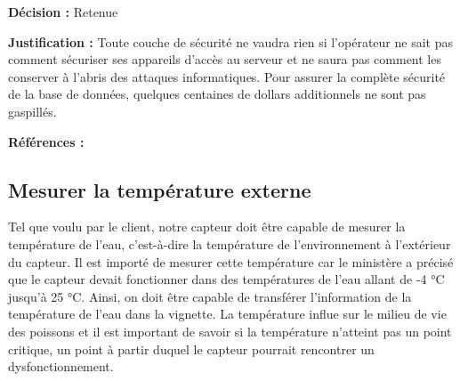 \textbf{Décision :}  Retenue

\textbf{Justification :}  Toute couche de sécurité ne vaudra rien si l’opérateur ne sait pas comment sécuriser ses appareils d’accès au serveur et ne saura pas comment les conserver à l’abris des attaques informatiques. Pour assurer la complète sécurité de la base de données, quelques centaines de dollars additionnels ne sont pas gaspillés.

\textbf{Références :} 

\begin{table}[!htb]
\footnotesize
\centering
{}
\end{table}


\subsection{Mesurer la température externe} 
Tel que voulu par le client, notre capteur doit être capable de mesurer la température de l’eau, c’est-à-dire la température de l’environnement à l’extérieur du capteur. Il est importé de mesurer cette température car le ministère a précisé que le capteur devait fonctionner dans des températures de l’eau allant de -4 °C jusqu’à 25 °C. Ainsi, on doit être capable de transférer l’information de la température de l’eau dans la vignette. La température influe sur le milieu de vie des poissons et il est important de savoir si la température n’atteint pas un point critique, un point à partir duquel le capteur pourrait rencontrer un dysfonctionnement. 

